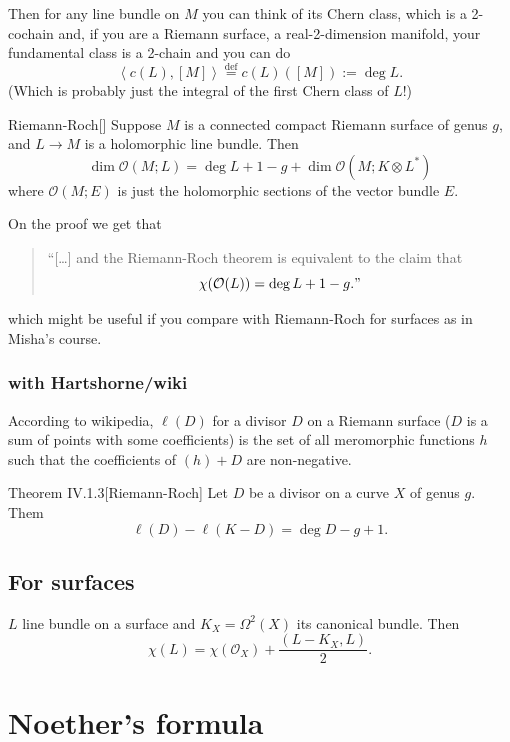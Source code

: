 Then for any line bundle on  \(M\) you can think of its Chern class, which is a 2-cochain and, if you are a Riemann surface, a real-2-dimension manifold, your fundamental class is a 2-chain and you can do
\[\left<c(L),[M]\right>\overset{\operatorname{def}}{=}c(L)([M]):=\operatorname{deg}L.\]
(Which is probably just the integral of the first Chern class of \(L\)!)
\begin{thing7}{Riemann-Roch}[\cite{lec}]\leavevmode
Suppose \(M\) is a connected compact Riemann surface of genus \(g\), and \(L \to M\) is a holomorphic line bundle. Then 
\[\dim \mathcal{O}(M;L)=\operatorname{deg}L+1-g+\dim\mathcal{O}(M;K\otimes L^*)\]
where \(\mathcal{O}(M;E)\) is just the holomorphic sections of the vector bundle \(E\).
\end{thing7}
\begin{remark}\leavevmode
On the proof we get that
\begin{quotation}
	``[…] and the Riemann-Roch theorem is equivalent to the claim that
	\[\chi(\mathcal{O}(L))=\operatorname{deg}L+1-g."\]
\end{quotation}
which might be useful if you compare with Riemann-Roch for surfaces as in Misha's course.
\end{remark}
\subsubsection{with Hartshorne/wiki}


According to wikipedia, \(\ell(D)\) for a divisor \(D\) on a Riemann surface (\(D\) is a sum of points with some coefficients) is the set of all meromorphic functions \(h\) such that the coefficients of \((h)+D\) are non-negative.
\begin{thing4}{Theorem IV.1.3}[Riemann-Roch]\label{prop:IV.1.3}\leavevmode
Let \(D\) be a divisor on a curve \(X\) of genus \(g\). Them
\[\ell(D)-\ell(K-D)=\operatorname{deg}D-g+1.\]
\end{thing4}

\subsection{For surfaces}
\begin{thm}[K3 course]\leavevmode
\(L\) line bundle on a surface and \(K_X=\Omega^2(X)\) its canonical bundle. Then
\[\chi(L)=\chi(\mathcal{O}_X)+\frac{(L-K_X,L)}{2}.\]
\end{thm}

\section{Noether's formula}

